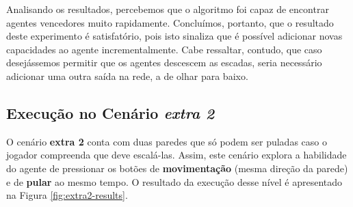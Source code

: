 Analisando os resultados, percebemos que o algoritmo foi capaz de encontrar
agentes vencedores muito rapidamente. Concluímos, portanto, que o resultado
deste experimento é satisfatório, pois isto sinaliza que é possível adicionar
novas capacidades ao agente incrementalmente. Cabe ressaltar, contudo, que caso
desejássemos permitir que os agentes descescem as escadas, seria necessário
adicionar uma outra saída na rede, a de olhar para baixo.

\subsection{\label{section:experiment-extra2}Execução no Cenário \textit{extra
2}}

O cenário \textbf{extra 2} conta com duas paredes que só podem ser puladas caso
o jogador compreenda que deve escalá-las. Assim, este cenário explora a
habilidade do agente de pressionar os botões de \textbf{movimentação} (mesma
direção da parede) e de \textbf{pular} ao mesmo tempo. O resultado da execução
desse nível é apresentado na Figura \ref{fig:extra2-results}.

